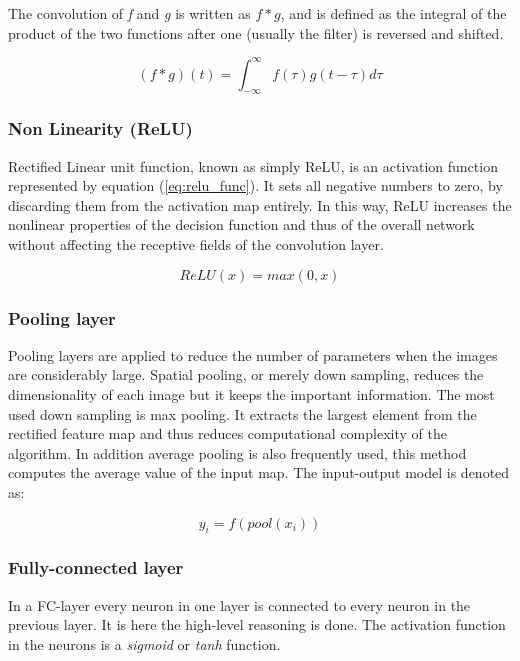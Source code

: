 \documentclass[thesis.tex]{subfiles}
\begin{document}
The convolution of \textit{f} and \textit{g} is written as $f*g$, and is defined as the integral of the product of the two functions after one (usually the filter) is reversed and shifted.

\begin{equation} %
  (f*g)(t) = \int_{-\infty}^{\infty} f(\tau) g(t-\tau) d\tau
  \label{eq:convolution_func}
\end{equation}


\subsubsection{Non Linearity (ReLU)}
Rectified Linear unit function, known as simply ReLU, is an activation function represented by equation (\ref{eq:relu_func}). It sets all negative numbers to zero, by discarding them from the activation map entirely. In this way, ReLU increases the nonlinear properties of the decision function and thus of the overall network without affecting the receptive fields of the convolution layer.

\begin{equation} %
    ReLU(x) = max(0, x)
    \label{eq:relu_func}
\end{equation}


\subsubsection{Pooling layer}
Pooling layers are applied to reduce the number of parameters when the images are considerably large. Spatial pooling, or merely down sampling, reduces the dimensionality of each image but it keeps the important information. The most used down sampling is max pooling. It extracts the largest element from the rectified feature map and thus reduces computational complexity of the algorithm. In addition average pooling is also frequently used, this method computes the average value of the input map. The input-output model is denoted as:

\begin{equation} %
  y_i = f(pool(x_i))
  \label{eq:pool_func}
\end{equation}


\subsubsection{Fully-connected layer}
In a FC-layer every neuron in one layer is connected to every neuron in the previous layer. It is here the high-level reasoning is done. The activation function in the neurons is a \textit{sigmoid} or \textit{tanh} function.
\end{document}
